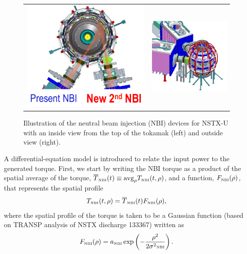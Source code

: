 \documentclass[12pt]{iopart}
\begin{document}
\begin{figure}
\begin{tabular}{cc}
\includegraphics[width=0.5\linewidth]{imene_figs/pic_NBI1} &
\includegraphics[width=0.4\linewidth]{imene_figs/pic_NBI2}
\end{tabular}
\caption{Illustration of the neutral beam injection (NBI) devices for NSTX-U with an inside view from the top of the tokamak (left) and outside view (right). }
\label{NBI_pics}
\end{figure}


A differential-equation model is introduced to relate the input power to the generated torque.  First, we start by writing the NBI torque as a product of the spatial average of the torque, $\overline{T}_\textrm{\tiny{NBI}}(t) \equiv \textrm{avg}_\rho T_\textrm{\tiny{NBI}}(t,\rho)$, and a function, $F_\textrm{\tiny{NBI}}(\rho)$, that represents the spatial profile
\begin{equation}
   T_\textrm{\tiny{NBI}}(t,\rho) = \overline{T}_\textrm{\tiny{NBI}}(t) F_\textrm{\tiny{NBI}}(\rho),
\label{eq5}
\end{equation}
where the spatial profile of the torque is taken to be a Gaussian function (based on TRANSP analysis of NSTX discharge 133367) written as
\begin{equation}
F_\textrm{\tiny{NBI}}(\rho) = a_\textrm{\tiny{NBI}} \exp\left( - \frac{\rho^2}{2\sigma^2\textrm{\tiny{NBI}}}\right).
\label{eq6}
\end{equation}
\end{document}
